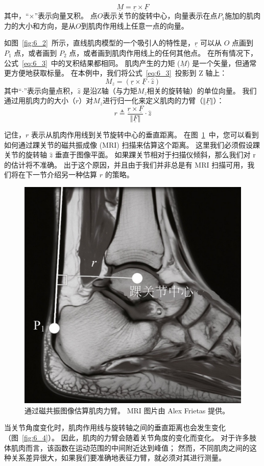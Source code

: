 \begin{equation}
	\underline{M} = \underline{r} \times \underline{F}
	\label{eq:6_3}
\end{equation}
%
其中，“$\times$”表示向量叉积。
点$O$表示关节的旋转中心，向量表示在点$P_1$施加的肌肉力的大小和方向，是从$O$到肌肉作用线上任意一点的向量。


如图~\ref{fig:6_2}~所示，直线肌肉模型的一个吸引人的特性是，$\underline{r}$ 可以从 $O$ 点画到 $P_1$ 点，或者画到 $P_2$ 点，或者画到肌肉作用线上的任何其他点。
在所有情况下，公式~\ref{eq:6_3}~中的叉积结果都相同。
肌肉产生的力矩 ($\underline{M}$) 是一个矢量，但通常更方便地获取标量。
在本例中，我们将公式~\ref{eq:6_3}~投影到 Z 轴上：
%
\begin{equation}
	M_z = ( \underline{r} \times \underline{F} \cdot \hat{z} )
	\label{eq:6_4}
\end{equation}
%
其中“$\cdot$”表示向量点积，$\hat{z}$ 是沿Z轴（与力矩$M_z$相关的旋转轴）的单位向量。
我们通过用肌肉力的大小（$r$）对$M_z$进行归一化来定义肌肉的力臂（$ \Vert \underline{F} \Vert $）：
%
\begin{equation}
	r \triangleq 
		\frac{
			\underline{r} \times \underline{F}
		}{
			\Vert \underline{F} \Vert
		}
		\cdot
		\hat{z}
	\label{eq:6_5}
\end{equation}


记住，$r$ 表示从肌肉作用线到关节旋转中心的垂直距离。
在图~\ref{fig:6_3}~中，您可以看到如何通过踝关节的磁共振成像 (MRI) 扫描来估算这个距离。
这里我们必须假设踝关节的旋转轴 $\hat{z}$ 垂直于图像平面。
如果踝关节相对于扫描仪倾斜，那么我们对 r 的估计将不准确。
出于这个原因，并且由于我们并非总是有 MRI 扫描可用，我们将在下一节介绍另一种估算 $r$ 的策略。


\begin{figure}[!htb]
	\centering
	\includegraphics[width=0.4\linewidth]{chap6/6_3}
	\caption{通过磁共振图像估算肌肉力臂。
		MRI 图片由 Alex Frietas 提供。 \label{fig:6_3}}
\end{figure}


当关节角度变化时，肌肉作用线与旋转轴之间的垂直距离也会发生变化（图~\ref{fig:6_4}）。
因此，肌肉的力臂会随着关节角度的变化而变化。
对于许多肢体肌肉而言，该函数在运动范围的中间附近达到峰值；
然而，不同肌肉之间的这种关系差异很大，如果我们要准确地表征力臂，就必须对其进行测量。


